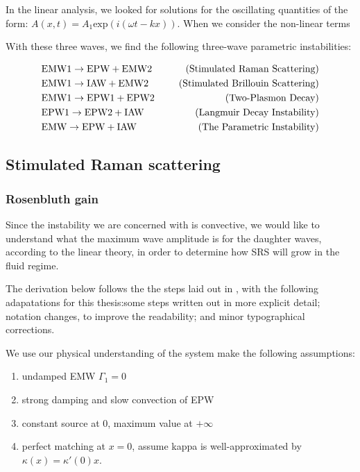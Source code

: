  In the linear analysis, we looked for solutions for the oscillating quantities of the form: $A(x,t) = A_1\text{exp}(i(\omega t - kx))$. When we consider the non-linear terms

With these three waves, we find the following three-wave parametric instabilities:

\begin{alignat*}{2}
	 	&\text{EMW1} \rightarrow \text{EPW} + \text{EMW2} &\text{\,\,\,\,\,\,\,\,\,(Stimulated Raman Scattering)}\\
	 	&\text{EMW1} \rightarrow \text{IAW} + \text{EMW2} &\text{\,\,\,\,\,\,\,\,\,(Stimulated Brillouin Scattering)}\\
	 	&\text{EMW1} \rightarrow \text{EPW1} + \text{EPW2} &\text{\,\,\,\,\,\,\,\,\,(Two-Plasmon Decay)}\\
	 	&\text{EPW1} \rightarrow \text{EPW2} + \text{IAW} &\text{\,\,\,\,\,\,\,\,\,(Langmuir Decay Instability)}\\
	 	&\text{EMW} \rightarrow \text{EPW} + \text{IAW} &\text{\,\,\,\,\,\,\,\,\,(The Parametric Instability)}\\
\end{alignat*}



\subsection{Stimulated Raman scattering}


\subsubsection{Rosenbluth gain}

Since the instability we are concerned with is convective, we would like to understand what the maximum wave amplitude is for the daughter waves, according to the linear theory, in order to determine how SRS will grow in the fluid regime.

The derivation below follows the the steps laid out in \citet{Nishikawa1976}, with the following adapatations for this thesis:some steps written out in more explicit detail; notation changes, to improve the readability; and minor typographical corrections. 

We use our physical understanding of the system make the following assumptions:
\begin{enumerate}
	\item undamped EMW $\Gamma_1 = 0$
	\item strong damping and slow convection of EPW
	\item constant source at 0, maximum value at $+\infty$
	\item perfect matching at $x=0$, assume kappa is well-approximated by 
	$\kappa(x) = \kappa'(0)x$.
\end{enumerate}

